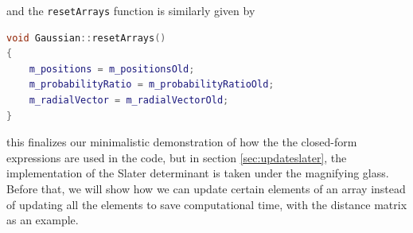 and the \lstinline{resetArrays} function is similarly given by
\begin{lstlisting}[language=c++,caption={Replacing new arrays with the old arrays, taken from \lstinline{gaussian.cpp}.}]
void Gaussian::resetArrays()
{
	m_positions = m_positionsOld;
	m_probabilityRatio = m_probabilityRatioOld;
	m_radialVector = m_radialVectorOld;
}
\end{lstlisting}
this finalizes our minimalistic demonstration of how the the closed-form expressions are used in the code, but in section \ref{sec:updateslater}, the implementation of the Slater determinant is taken under the magnifying glass. Before that, we will show how we can update certain elements of an array instead of updating all the elements to save computational time, with the distance matrix as an example.


